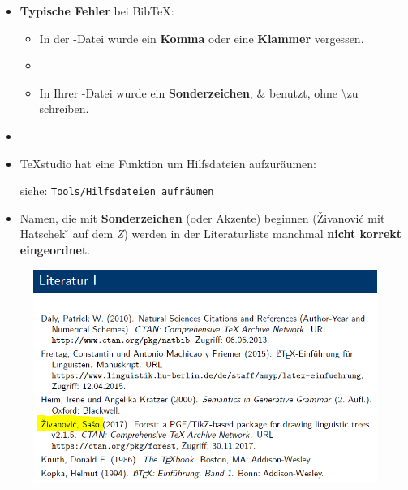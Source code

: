 \begin{frame}

\begin{itemize}	
	\item \textbf{Typische Fehler} bei Bib\TeX :
	
	\begin{itemize}
		\item In der -Datei wurde ein \textbf{Komma} oder eine \textbf{Klammer} vergessen.
		
		\item[]
		
		\item In Ihrer -Datei wurde ein \textbf{Sonderzeichen}, \zB \& benutzt, ohne \textbackslash  zu schreiben.
	\end{itemize} 

	\item[]
	
	\item TeXstudio hat eine Funktion um Hilfsdateien aufzuräumen:
	
	siehe: \texttt{Tools/Hilfsdateien aufräumen}
\end{itemize}

\end{frame}


\begin{frame}[fragile]

\begin{itemize}
	\item Namen, die mit \textbf{Sonderzeichen} (oder Akzente) beginnen (\zB \v{Z}ivanović mit Hatschek \v{} auf dem \emph{Z}) werden in der Literaturliste manchmal \textbf{nicht korrekt eingeordnet}.
\end{itemize}

\begin{figure}
	\centering
	\includegraphics[scale=.4]{../../texfiles-beamer/tex-material/WissArb-latex/bib-Liste-false1}
\end{figure}

\nocite{WieseB11a}
\nocite{Zivanovic17a}

\end{frame}


